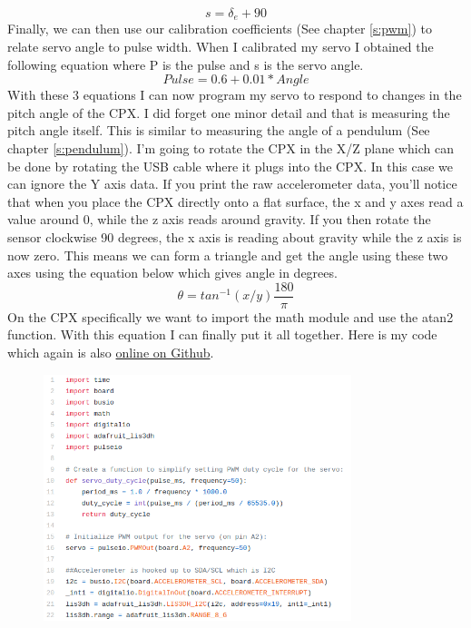\begin{equation}
s = \delta_e + 90
\end{equation}
Finally, we can then use our calibration coefficients (See chapter \ref{s:pwm}) to relate servo angle to pulse width. When I calibrated my servo I obtained the following equation where P is the pulse and s is the servo angle.
\begin{equation}
Pulse = 0.6 + 0.01*Angle
\end{equation}
With these 3 equations I can now program my servo to respond to changes in the pitch angle of the CPX. I did forget one minor detail and that is measuring the pitch angle itself. This is similar to measuring the angle of a pendulum (See chapter \ref{s:pendulum}). I’m going to rotate the CPX in the X/Z plane which can be done by rotating the USB cable where it plugs into the CPX. In this case we can ignore the Y axis data. If you print the raw accelerometer data, you’ll notice that when you place the CPX directly onto a flat surface, the x and y axes read a value around 0, while the z axis reads around gravity. If you then rotate the sensor clockwise 90 degrees, the x axis is reading about gravity while the z axis is now zero. This means we can form a triangle and get the angle using these two axes using the equation below which gives angle in degrees.
\begin{equation}
\theta = tan^{-1}(x/y)\frac{180}{\pi}
\end{equation}
On the CPX specifically we want to import the math module and use the atan2 function. With this equation I can finally put it all together. Here is my code which again is also \href{https://github.com/cmontalvo251/Microcontrollers/blob/master/Circuit_Playground/CircuitPython/Servo/feedback_control_servo.py}{online on Github}.
\begin{figure}[H]
  \begin{center}
    \includegraphics[width=0.8\textwidth]{Figures/feedback1.png}
  \end{center}
\end{figure}
